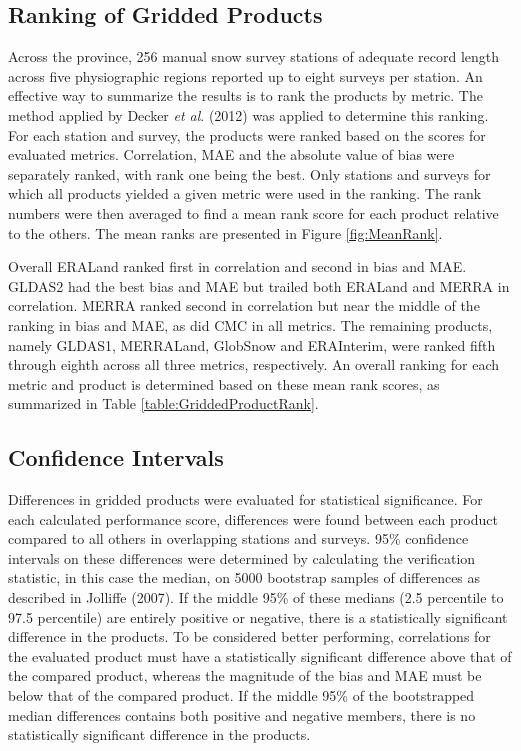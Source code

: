 \documentclass[12pt]{article}
\begin{document}
\subsection{Ranking of Gridded Products}
Across the province, 256 manual snow survey stations of adequate record length across five physiographic regions reported up to eight surveys per station.  An effective way to summarize the results is to rank the products by metric.  The method applied by Decker \textit{et al}. (2012) was applied to determine this ranking.  For each station and survey, the products were ranked based on the scores for evaluated metrics.  
Correlation, MAE and the absolute value of bias were separately ranked, with rank one being the best.  Only stations and surveys for which all products yielded a given metric were used in the ranking.  The rank numbers were then averaged to find a mean rank score for each product relative to the others.  The mean ranks are presented in Figure \ref{fig:MeanRank}.  

Overall ERALand ranked first in correlation and second in bias and MAE.  GLDAS2 had the best bias and MAE but trailed both ERALand and MERRA in correlation.  MERRA ranked second in correlation but near the middle of the ranking in bias and MAE, as did CMC in all metrics.  The remaining products, namely GLDAS1, MERRALand, GlobSnow and ERAInterim, were ranked fifth through eighth across all three metrics, respectively.  An overall ranking for each metric and product is determined based on these mean rank scores, as summarized in Table \ref{table:GriddedProductRank}.


\subsection{Confidence Intervals}
Differences in gridded products were evaluated for statistical significance.  For each calculated performance score, differences were found between each product compared to all others in overlapping stations and surveys.  95\% confidence intervals on these differences were determined by calculating the verification statistic, in this case the median, on 5000 bootstrap samples of differences as described in Jolliffe (2007).  If the middle 95\% of these medians (2.5 percentile to 97.5 percentile) are entirely positive or negative, there is a statistically significant difference in the products.  
To be considered better performing, correlations for the evaluated product must have a statistically significant difference above that of the compared product, whereas the magnitude of the bias and MAE must be below that of the compared product.  If the middle 95\% of the bootstrapped median differences contains both positive and negative members, there is no statistically significant difference in the products.  
\end{document}
